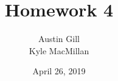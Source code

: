\documentclass[12pt]{article}
\title{Homework 4}
\author{Austin Gill \\ Kyle MacMillan}
\date{April 26, 2019}
\begin{document}
\begin{titlingpage}
    \begin{center}
        \huge\thetitle{}\\
        \vspace{1cm}
        \large\theauthor{}\\
        \vspace{1cm}
        \large\thedate{}\\
        \vfill
    \end{center}
\end{titlingpage}

\begingroup
\hypersetup{linkcolor=black}
\tableofcontents
\listoftodos
\endgroup
\newpage



\end{document}

